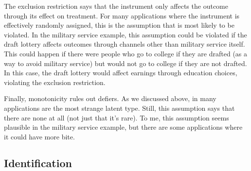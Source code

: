 \documentclass[
  letterpaper,
  DIV=11,
  numbers=noendperiod]{scrreprt}
\begin{document}
The exclusion restriction says that the instrument only affects the
outcome through its effect on treatment. For many applications where the
instrument is effectively randomly assigned, this is the assumption that
is most likely to be violated. In the military service example, this
assumption could be violated if the draft lottery affects outcomes
through channels other than military service itself. This could happen
if there were people who go to college if they are drafted (as a way to
avoid military service) but would not go to college if they are not
drafted. In this case, the draft lottery would affect earnings through
education choices, violating the exclusion restriction.

Finally, monotonicity rules out defiers. As we discussed above, in many
applications are the most strange latent type. Still, this assumption
says that there are none at all (not just that it's rare). To me, this
assumption seems plausible in the military service example, but there
are some applications where it could have more bite.

\subsection{Identification}\label{identification}
\end{document}
